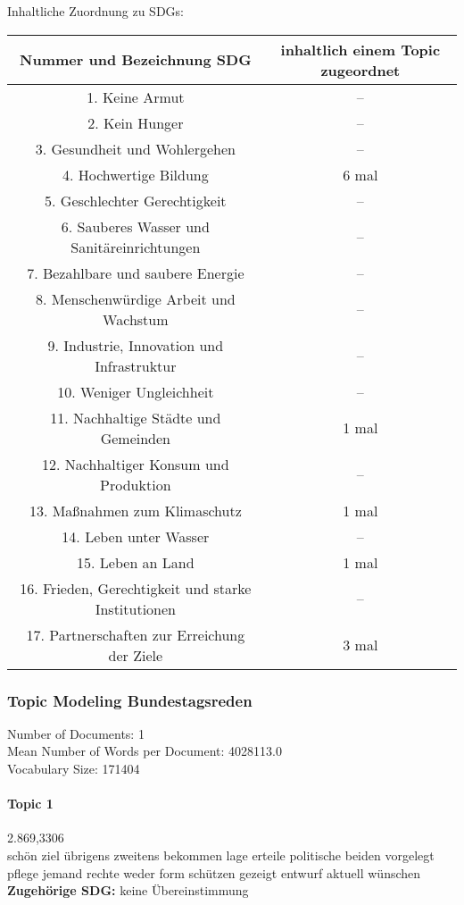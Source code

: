 \documentclass[a4paper,11pt]{article}
\begin{document}
Inhaltliche Zuordnung zu SDGs: 
\begin{center}
\begin{tabular}{ |c|c|} \hline
Nummer und Bezeichnung SDG & inhaltlich einem Topic zugeordnet\\\hline
1. Keine Armut & -- \\\hline 
2. Kein Hunger & -- \\\hline
3. Gesundheit und Wohlergehen & -- \\\hline
4. Hochwertige Bildung & 6 mal \\\hline 
5. Geschlechter Gerechtigkeit & -- \\\hline
6. Sauberes Wasser und Sanitäreinrichtungen & -- \\\hline
7. Bezahlbare und saubere Energie & -- \\\hline 
8. Menschenwürdige Arbeit und Wachstum & -- \\\hline 
9. Industrie, Innovation und Infrastruktur & -- \\\hline 
10. Weniger Ungleichheit & -- \\\hline 
11. Nachhaltige Städte und Gemeinden & 1 mal \\\hline 
12. Nachhaltiger Konsum und Produktion & -- \\\hline 
13. Maßnahmen zum Klimaschutz & 1 mal \\\hline 
14. Leben unter Wasser & -- \\\hline 
15. Leben an Land & 1 mal \\\hline 
16. Frieden, Gerechtigkeit und starke Institutionen & -- \\\hline 
17. Partnerschaften zur Erreichung der Ziele & 3 mal \\\hline 
\end{tabular}
\end{center}

\subsubsection{Topic Modeling Bundestagsreden}
Number of Documents: 1\\
Mean Number of Words per Document: 4028113.0\\
Vocabulary Size: 171404\\

\paragraph{Topic 1} 2.869,3306 \\
schön ziel übrigens zweitens bekommen lage erteile politische beiden vorgelegt
pflege jemand rechte weder form schützen gezeigt entwurf aktuell wünschen\\ 
\textbf{Zugehörige SDG:}  keine Übereinstimmung
\end{document}
